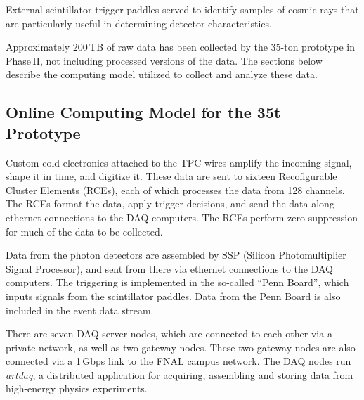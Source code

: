 \noindent
External scintillator trigger paddles 
served to identify samples of cosmic rays that are particularly useful in determining
detector characteristics.


Approximately 200\,TB of raw data has been collected by the 35-ton prototype in Phase\,II, not including processed versions of the data.
The sections below describe the computing model utilized to collect and analyze these data.

\subsection{Online Computing Model for the 35t Prototype}

Custom cold electronics attached to the TPC wires amplify the incoming signal, shape it in time,
and digitize it.  These data are sent to sixteen Recofigurable Cluster Elements (RCEs), each of which
processes the data from 128 channels.  The RCEs format the data, apply trigger decisions, and send the
data along ethernet connections to the DAQ computers.  The RCEs perform zero suppression for
much of the data to be collected.

Data from the photon detectors are assembled by SSP (Silicon Photomultiplier Signal Processor),
and sent from there via ethernet connections to the DAQ computers.  The triggering is implemented
in the so-called ``Penn Board'', which inputs signals from the scintillator paddles.  Data
from the Penn Board is also included in the event data stream.

There are seven DAQ server nodes, which are connected to each other via a private network, as well as two gateway nodes. 
These two gateway nodes are also connected via a 1\,Gbps link to the FNAL campus network. The DAQ nodes run {\it artdaq},
a distributed application for acquiring, assembling and storing data from high-energy physics experiments. 

